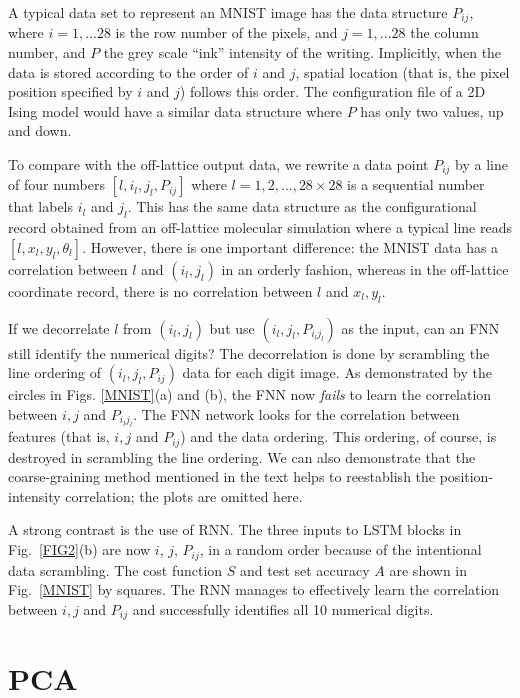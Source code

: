 A typical data set to represent an MNIST image has the data structure $P_{ij}$, where $i=1,...28$ is the row number of the pixels, and $j=1,...28$ the column number, and $P$ the grey scale ``ink'' intensity of the writing. Implicitly, when the data is stored according to the order of $i$ and $j$, spatial location (that is, the pixel position specified by $i$ and $j$) follows this order. The configuration file of a 2D Ising model would have a similar data structure where $P$ has only two values, up and down.

To compare with the off-lattice output data, we rewrite a data point $P_{ij}$ by a line of four numbers $[l, i_l, j_l, P_{ij}]$ where $l
=1,2,\dots,28\times 28$ is a sequential number that labels $i_l$ and $j_l$. This has the same data structure as the configurational record obtained from an off-lattice molecular simulation where a typical line reads $[l, x_l, y_l, \theta_l]$. However, there is one important difference: the MNIST data has a correlation between $l$ and $(i_l, j_l)$ in an orderly fashion, whereas in the off-lattice coordinate record, there is no correlation between $l$ and $x_l, y_l$.

If we decorrelate $l$ from $(i_l, j_l)$ but use $(i_l, j_l, P_{i_lj_l})$ as the input, can an FNN still identify the numerical digits? The decorrelation is done by scrambling the line ordering of  $(i_l, j_l, P_{ij})$ data for each digit image.
As demonstrated by the circles in Figs. \ref{MNIST}(a) and (b), the FNN now {\emph {fails}} to learn the correlation between $i, j$ and $P_{i_lj_l}$.
The FNN network looks for the correlation between features (that is, $i, j$ and $P_{ij}$) and the data ordering. This ordering, of course, is destroyed in scrambling the line ordering. We can also demonstrate that the coarse-graining method mentioned in the text helps to reestablish the position-intensity correlation; the plots are omitted here.

A strong contrast is the use of RNN. The three inputs to LSTM blocks in Fig.\ \ref{FIG2}(b) are now $i$, $j$, $P_{ij}$, in a random order because of the intentional data scrambling.
The cost function $S$ and test set accuracy $A$ are shown in Fig.~\ref{MNIST} by squares. The RNN manages to effectively learn the correlation between $i, j$ and $P_{ij}$ and successfully identifies all 10 numerical digits.

\vfill



\section{PCA}





